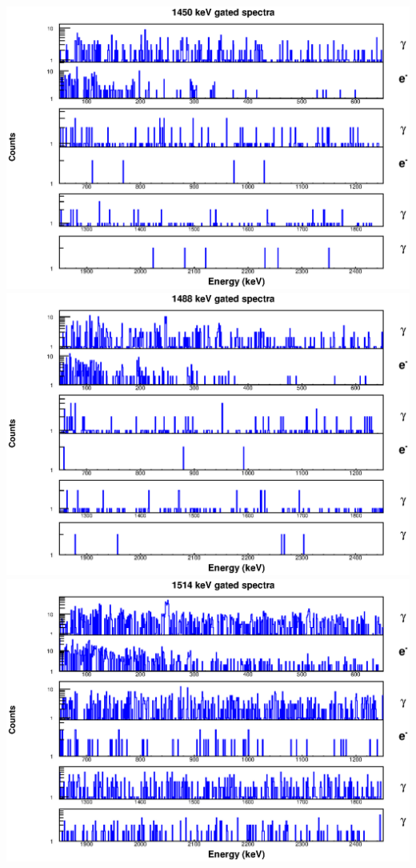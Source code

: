 \includegraphics[scale=0.8]{154Gd_Appendix/1450_combined.eps}
\includegraphics[scale=0.8]{154Gd_Appendix/1488_combined.eps}
\includegraphics[scale=0.8]{154Gd_Appendix/1514_combined.eps}

